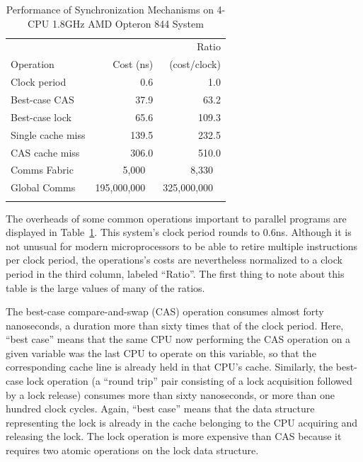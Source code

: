 \begin{table}
\centering
\begin{tabular}{l||r|r}
				& 	 	& Ratio \\
	Operation		& Cost (ns) 	& (cost/clock) \\
	\hline
	\hline
	Clock period		&           0.6	&           1.0 \\
	\hline
	Best-case CAS		&          37.9	&          63.2 \\
	\hline
	Best-case lock		&          65.6	&         109.3 \\
	\hline
	Single cache miss	&         139.5	&         232.5 \\
	\hline
	CAS cache miss		&         306.0	&         510.0 \\
	\hline
	Comms Fabric		&       5,000\textcolor{white}{.0}
						&       8,330\textcolor{white}{.0}
								\\
	\hline
	Global Comms		& 195,000,000\textcolor{white}{.0}
						& 325,000,000\textcolor{white}{.0} \\
								\\
\end{tabular}
\caption{Performance of Synchronization Mechanisms on 4-CPU 1.8GHz AMD Opteron 844 System}
\label{tab:cpu:Performance of Synchronization Mechanisms on 4-CPU 1.8GHz AMD Opteron 844 System}
\end{table}

The overheads of some common operations important to parallel programs are
displayed in
Table~\ref{tab:cpu:Performance of Synchronization Mechanisms on 4-CPU 1.8GHz AMD Opteron 844 System}.
This system's clock period rounds to 0.6ns.
Although it is not unusual for modern microprocessors to be able to
retire multiple instructions per clock period, the operations's costs are
nevertheless normalized to a clock period in the third column, labeled
``Ratio''.
The first thing to note about this table is the large values of many of
the ratios.

The best-case compare-and-swap (CAS) operation consumes almost forty
nanoseconds, a duration more than sixty times that of the clock period.
Here, ``best case'' means that the same CPU now performing the CAS operation
on a given variable was the last CPU to operate on this variable, so
that the corresponding cache line is already held in that CPU's cache.
Similarly, the best-case lock operation (a ``round trip'' pair consisting
of a lock acquisition followed by a lock release) consumes more than
sixty nanoseconds, or more than one hundred clock cycles.
Again, ``best case'' means that the data structure representing the
lock is already in the cache belonging to the CPU acquiring and releasing
the lock.
The lock operation is more expensive than CAS because it requires two
atomic operations on the lock data structure.

